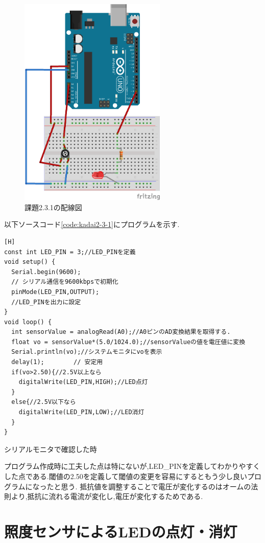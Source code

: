 \documentclass{jarticle}
\begin{document}
\begin{figure}[H]
\begin{center}
\includegraphics[width=7.0cm]{images/kadai2-3-1_bread.png}
\caption{課題2.3.1の配線図}
\label{fig:enshu2-3-1sokutei}
\end{center}
\end{figure}

以下ソースコード\ref{code:kadai2-3-1}にプログラムを示す.


\begin{lstlisting}[caption = 課題2.3.1,label=code:kadai2-3-1][H]
const int LED_PIN = 3;//LED_PINを定義
void setup() {
  Serial.begin(9600);
  // シリアル通信を9600kbpsで初期化
  pinMode(LED_PIN,OUTPUT);
  //LED_PINを出力に設定
}
void loop() {
  int sensorValue = analogRead(A0);//A0ピンのAD変換結果を取得する.
  float vo = sensorValue*(5.0/1024.0);//sensorValueの値を電圧値に変換
  Serial.println(vo);//システムモニタにvoを表示
  delay(1);        // 安定用
  if(vo>2.50){//2.5V以上なら
    digitalWrite(LED_PIN,HIGH);//LED点灯
  }
  else{//2.5V以下なら
    digitalWrite(LED_PIN,LOW);//LED消灯
  } 
}
\end{lstlisting}

シリアルモニタで確認した時

プログラム作成時に工夫した点は特にないが,LED_PINを定義してわかりやすくした点である.閾値の2.50を定義して閾値の変更を容易にするともう少し良いプログラムになったと思う.
抵抗値を調整することで電圧が変化するのはオームの法則より,抵抗に流れる電流が変化し,電圧が変化するためである.

\section{照度センサによるLEDの点灯・消灯}
\end{document}
